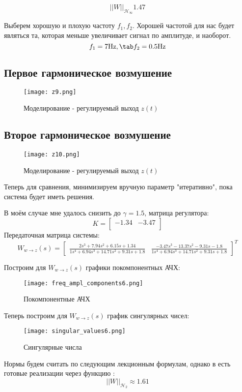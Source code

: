 $$
    ||W||_{\mathcal{H}_\infty} 1.47
$$

Выберем хорошую и плохую частоту $f_1, f_2$. 
Хорошей частотой для нас будет являться та, которая меньше увеличивает сигнал по амплитуде, и наоборот.
$$
    f_1 = 7 \text{Hz}, \tab f_2 = 0.5 \text{Hz}
$$

\newpage
\subsection{Первое гармоническое возмушение}
\begin{figure}[ht]
    \centering
    \texttt{[image: z9.png]}
    \caption{Моделирование -  регулируемый выход $z(t)$}
  \end{figure}
\newpage
\subsection{Второе гармоническое возмушение}
\begin{figure}[ht]
    \centering
    \texttt{[image: z10.png]}
    \caption{Моделирование -  регулируемый выход $z(t)$}
  \end{figure}


Теперь для сравнения, минимизируем вручную параметр "итеративно", пока система будет иметь решения.

В моём случае мне удалось снизить до $\gamma = 1.5$, матрица регулятора: 
$$
    K = \begin{bmatrix}
        -1.34 & -3.47 \\
    \end{bmatrix}
$$
Передаточная матрица системы:
$$
    W_{w\rightarrow z}(s) = \begin{bmatrix}\frac{2s^{3} + 7.94s^{2} + 6.15s + 1.34}{1s^{4} + 6.94s^{3} + 14.71s^{2} + 9.31s + 1.8} & \frac{-3.47s^{3} - 13.37s^{2} - 9.31s - 1.8}{1s^{4} + 6.94s^{3} + 14.71s^{2} + 9.31s + 1.8} \end{bmatrix}^T
$$

Построим для $W_{w\rightarrow z}(s)$ графики покомпонентных АЧХ:
\begin{figure}[ht]
    \centering
    \texttt{[image: freq\_ampl\_components6.png]}
    \caption{Покомпонентные АЧХ}
  \end{figure}
Теперь построим для $W_{w\rightarrow z}(s)$ график сингулярных чисел:
\begin{figure}[ht]
  \centering
  \texttt{[image: singular\_values6.png]}
  \caption{Сингулярные числа}
\end{figure}
Нормы будем считать по следующим лекционным формулам, однако в  
есть готовые реализации через функцию :
$$
    ||W||_{\mathcal{H}_2} \approx 1.61
$$

